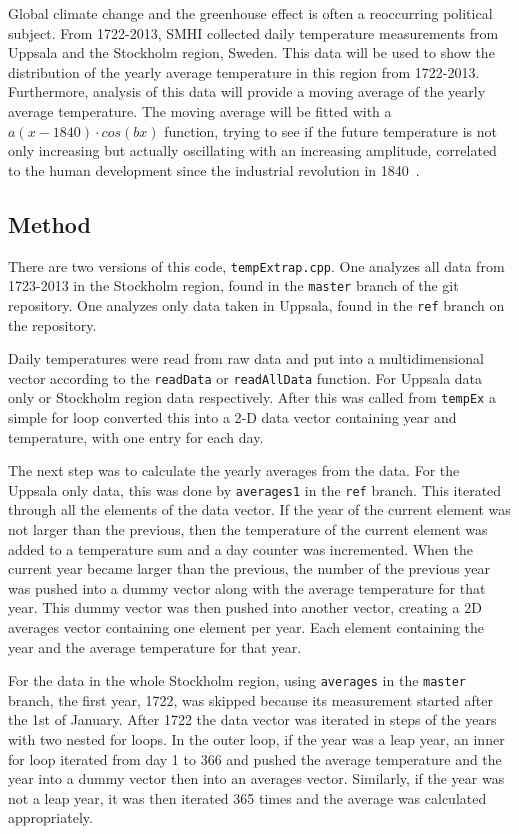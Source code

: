 

Global climate change and the greenhouse effect is often a reoccurring political subject. From 1722-2013, SMHI collected daily temperature measurements from Uppsala and the Stockholm region, Sweden. This data will be used to show the distribution of the yearly average temperature in this region from 1722-2013. Furthermore, analysis of this data will provide a moving average of the yearly average temperature. The moving average will be fitted with a $a(x-1840)\cdot cos(bx)$ function, trying to see if the future temperature is not only increasing but actually oscillating with an increasing amplitude, correlated to the human development since the industrial revolution in 1840~\cite{industrial}.

\subsection{Method}
There are two versions of this code, \texttt{tempExtrap.cpp}. One analyzes all data from 1723-2013 in the Stockholm region, found in the \texttt{master} branch of the git repository. One analyzes only data taken in Uppsala, found in the \texttt{ref} branch on the repository.

Daily temperatures were read from raw data and put into a multidimensional vector according to the \texttt{readData} or \texttt{readAllData} function. For Uppsala data only or Stockholm region data respectively. After this was called from \texttt{tempEx} a simple for loop converted this into a 2-D data vector containing year and temperature, with one entry for each day.

The next step was to calculate the yearly averages from the data. For the Uppsala only data, this was done by \texttt{averages1} in the \texttt{ref} branch. This iterated through all the elements of the data vector. If the year of the current element was not larger than the previous, then the temperature of the current element was added to a temperature sum and a day counter was incremented. When the current year became larger than the previous, the number of the previous year was pushed into a dummy vector along with the average temperature for that year. This dummy vector was then pushed into another vector, creating a 2D averages vector containing one element per year. Each element containing the year and the average temperature for that year.

For the data in the whole Stockholm region, using \texttt{averages} in the \texttt{master} branch, the first year, 1722, was skipped because its measurement started after the 1st of January. After 1722 the data vector was iterated in steps of the years with two nested for loops. In the outer loop, if the year was a leap year, an inner for loop iterated from day 1 to 366 and pushed the average temperature and the year into a dummy vector then into an averages vector. Similarly, if the year was not a leap year, it was then iterated 365 times and the average was calculated appropriately.


